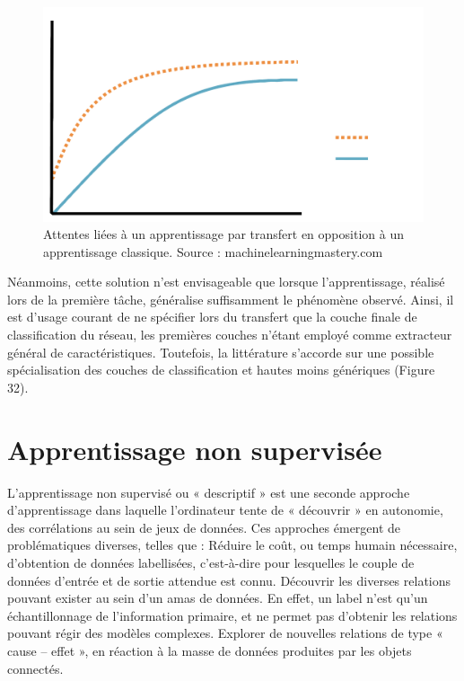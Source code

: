 \begin{figure}[H]
    \centering
    \includegraphics[width=\linewidth]{contents/chapter_3/resources/DeepLearningCurves.png}
    \caption{ Attentes liées à un apprentissage par transfert en opposition à un apprentissage classique. Source : machinelearningmastery.com}
    \label{fig:chapter_3:deep_understanding}
\end{figure}

Néanmoins, cette solution n’est envisageable que lorsque l’apprentissage, réalisé lors de la première tâche, généralise suffisamment le phénomène observé. Ainsi, il est d’usage courant de ne spécifier lors du transfert que la couche finale de classification du réseau, les premières couches n’étant employé comme extracteur général de caractéristiques. Toutefois, la littérature s’accorde sur une possible spécialisation des couches de classification et hautes moins génériques (Figure 32).
   

\section{Apprentissage non supervisée}
L’apprentissage non supervisé ou « descriptif » est une seconde approche d’apprentissage dans laquelle l’ordinateur tente de « découvrir » en autonomie, des corrélations au sein de jeux de données. Ces approches émergent de problématiques diverses, telles que :
	Réduire le coût, ou temps humain nécessaire, d’obtention de données labellisées, c’est-à-dire pour lesquelles le couple de données d’entrée et de sortie attendue est connu.
	Découvrir les diverses relations pouvant exister au sein d’un amas de données. En effet, un label n’est qu’un échantillonnage de l’information primaire, et ne permet pas d’obtenir les relations pouvant régir des modèles complexes.
	Explorer de nouvelles relations de type « cause – effet », en réaction à la masse de données produites par les objets connectés. 


